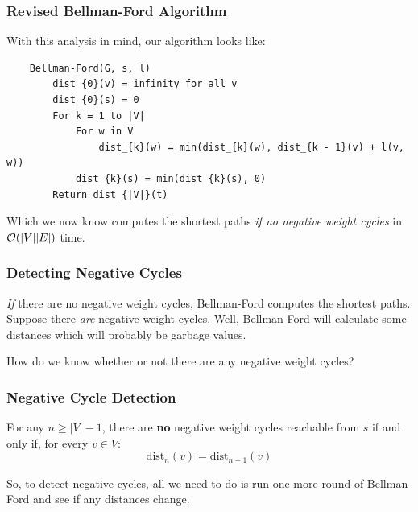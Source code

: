 \documentclass[letterpaper]{article}
\begin{document}
\subsubsection{Revised Bellman-Ford Algorithm}
With this analysis in mind, our algorithm looks like: 
\begin{verbatim}
    Bellman-Ford(G, s, l)
        dist_{0}(v) = infinity for all v 
        dist_{0}(s) = 0
        For k = 1 to |V|
            For w in V
                dist_{k}(w) = min(dist_{k}(w), dist_{k - 1}(v) + l(v, w))
            dist_{k}(s) = min(dist_{k}(s), 0)
        Return dist_{|V|}(t)
\end{verbatim}
Which we now know computes the shortest paths \emph{if no negative weight cycles} in $\mathcal{O}(|V||E|)$ time. 


\subsubsection{Detecting Negative Cycles}
\emph{If} there are no negative weight cycles, Bellman-Ford computes the shortest paths. Suppose there \emph{are} negative weight cycles. Well, Bellman-Ford will calculate some distances which will probably be garbage values.

\bigskip 

How do we know whether or not there are any negative weight cycles? 

\subsubsection{Negative Cycle Detection}
\begin{proposition}
    For any $n \geq |V| - 1$, there are \textbf{no} negative weight cycles reachable from $s$ if and only if, for every $v \in V$:
    \[\text{dist}_{n}(v) = \text{dist}_{n + 1}(v)\]
\end{proposition}
So, to detect negative cycles, all we need to do is run one more round of Bellman-Ford and see if any distances change. 
\end{document}
